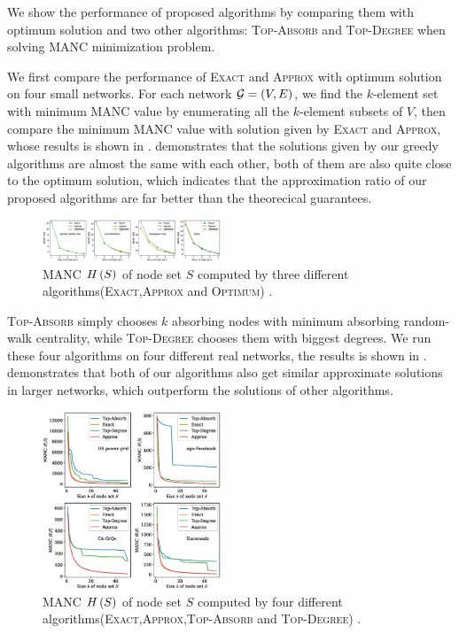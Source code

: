 \documentclass[sigconf]{acmart}
\begin{document}
We show the performance of proposed algorithms by comparing them with optimum solution and two other algorithms: \textsc{Top-Absorb} and \textsc{Top-Degree} when solving MANC minimization problem.

We first compare the performance of \textsc{Exact} and \textsc{Approx} with optimum solution on four small networks.
For each network \(\mathcal{G}=(V,E)\), we find the \(k\)-element set with minimum MANC value by enumerating all the \(k\)-element subsets of \(V\), then compare the minimum MANC value with solution given by \textsc{Exact} and \textsc{Approx}, whose results is shown in .
 demonstrates that the solutions given by our greedy algorithms are almost the same with each other, both of them are also quite close to the optimum solution, which indicates that the approximation ratio of our proposed algorithms are far better than the theorecical guarantees.

\begin{figure}
    \centering
    \includegraphics[width=0.475\textwidth]{compare_effects_optimum.eps}
    \caption{MANC \(H\left(S\right)\) of node set \(S\) computed by three different algorithms(\textsc{Exact},\textsc{Approx} and \textsc{Optimum})
        .\label{pic:compare-effect-optimum}}
\end{figure}

\textsc{Top-Absorb} simply chooses \(k\) absorbing nodes with minimum absorbing random-walk centrality, while \textsc{Top-Degree} chooses them with biggest degrees.
We run these four algorithms on four different real networks, the results is shown in .
 demonstrates that both of our algorithms also get similar approximate solutions in larger networks, which outperform the solutions of other algorithms.

\begin{figure}
    \centering
    \includegraphics[width=0.475\textwidth]{compare_effects_exact.eps}
    \caption{MANC \(H\left(S\right)\) of node set \(S\) computed by four different algorithms(\textsc{Exact},\textsc{Approx},\textsc{Top-Absorb} and \textsc{Top-Degree})
        .\label{pic:compare-effect}}
\end{figure}
\end{document}
